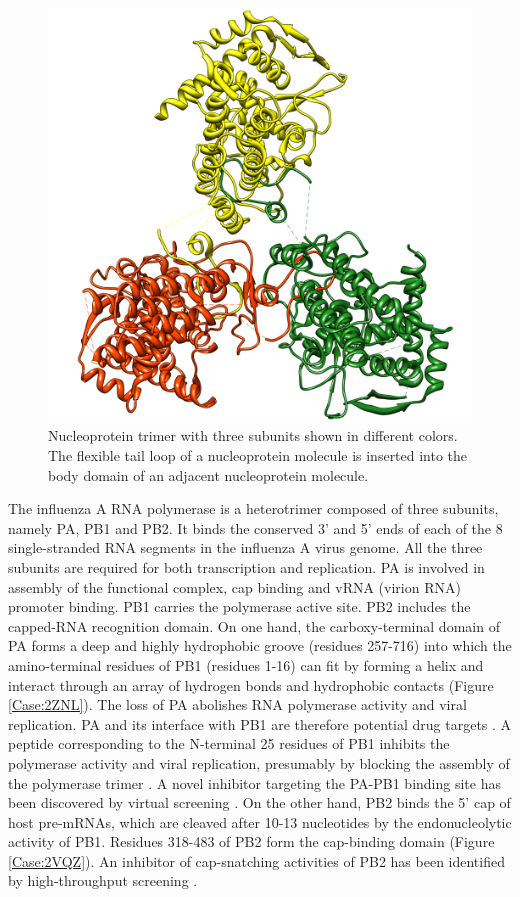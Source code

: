 \begin{figure}
\centering
\includegraphics[width=\linewidth]{Case/2IQH.png}
\caption{Nucleoprotein trimer with three subunits shown in different colors. The flexible tail loop of a nucleoprotein molecule is inserted into the body domain of an adjacent nucleoprotein molecule.}
\label{Case:2IQH}
\end{figure}

The influenza A RNA polymerase is a heterotrimer composed of three subunits, namely PA, PB1 and PB2. It binds the conserved 3' and 5' ends of each of the 8 single-stranded RNA segments in the influenza A virus genome. All the three subunits are required for both transcription and replication. PA is involved in assembly of the functional complex, cap binding and vRNA (virion RNA) promoter binding. PB1 carries the polymerase active site. PB2 includes the capped-RNA recognition domain. On one hand, the carboxy-terminal domain of PA forms a deep and highly hydrophobic groove (residues 257-716) into which the amino-terminal residues of PB1 (residues 1-16) can fit by forming a helix and interact through an array of hydrogen bonds and hydrophobic contacts \citep{1141} (Figure \ref{Case:2ZNL}). The loss of PA abolishes RNA polymerase activity and viral replication. PA and its interface with PB1 are therefore potential drug targets \citep{1141}. A peptide corresponding to the N-terminal 25 residues of PB1 inhibits the polymerase activity and viral replication, presumably by blocking the assembly of the polymerase trimer \citep{1234}. A novel inhibitor targeting the PA-PB1 binding site has been discovered by virtual screening \citep{1235}. On the other hand, PB2 binds the 5' cap of host pre-mRNAs, which are cleaved after 10-13 nucleotides by the endonucleolytic activity of PB1. Residues 318-483 of PB2 form the cap-binding domain (Figure \ref{Case:2VQZ}). An inhibitor of cap-snatching activities of PB2 has been identified by high-throughput screening \citep{1236}.

